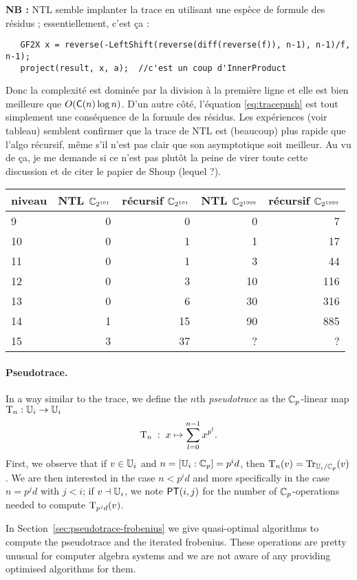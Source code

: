 \textbf{NB :} NTL semble implanter la trace en utilisant une espèce de
formule des résidus ; essentiellement, c'est ça :
{\footnotesize
\begin{verbatim}
   GF2X x = reverse(-LeftShift(reverse(diff(reverse(f)), n-1), n-1)/f, n-1);
   project(result, x, a);  //c'est un coup d'InnerProduct
\end{verbatim}}
Donc la complexité est dominée par la division à la première ligne et
elle est bien meilleure que $O(\mathrm{\sf C}(n)\log n)$. D'un autre côté,
l'équation \eqref{eq:tracepush} est tout simplement une conséquence de
la formule des résidus. Les expériences (voir tableau) semblent
confirmer que la trace de NTL est (beaucoup) plus rapide que l'algo
récursif, même s'il n'est pas clair que son asymptotique soit
meilleur. Au vu de ça, je me demande si ce n'est pas plutôt la peine
de virer toute cette discussion et de citer le papier de Shoup (lequel
?).

\begin{tabular}{|l|r|r|r|r|}
  \hline
  niveau & NTL $\mathbb{C}_{2^{101}}$ & récursif $\mathbb{C}_{2^{101}}$ & NTL $\mathbb{C}_{2^{1999}}$ &
  récursif $\mathbb{C}_{2^{1999}}$ \\
  \hline
  9  & 0 &  0 &  0 &   7\\
  10 & 0 &  1 &  1 &  17\\
  11 & 0 &  1 &  3 &  44\\
  12 & 0 &  3 & 10 & 116\\
  13 & 0 &  6 & 30 & 316\\
  14 & 1 & 15 & 90 & 885\\
  15 & 3 & 37 &  ? &   ?\\
  \hline
\end{tabular}


\paragraph{Pseudotrace.}
In a way similar to the trace, we define the $n$th {\em pseudotrace}
as the $\mathbb{C}_p$-linear map $\operatorname{T}_n : \mathbb{U}_i \rightarrow \mathbb{U}_i$ 
\[\operatorname{T}_n \;:\; x \mapsto \sum_{l=0}^{n-1} x^{p^l} \text{.}\]
First, we observe that if $v\in\mathbb{U}_i$ and $n=[\mathbb{U}_i:\mathbb{C}_p]=p^id$, then
${\operatorname{T}_n(v) = \operatorname{Tr}_{\mathbb{U}_i/\mathbb{C}_p}(v)}$. We are then interested in the case
$n<p^id$ and more specifically in the case $n = p^jd$ with $j<i$; if
$v\dashv\mathbb{U}_i$, we note $\mathrm{\sf PT}(i,j)$ for the number of
$\mathbb{C}_p$-operations needed to compute $\operatorname{T}_{p^jd}(v)$.

In Section~\ref{sec:pseudotrace-frobenius} we give quasi-optimal algorithms
to compute the pseudotrace and the iterated frobenius. These
operations are pretty unusual for computer algebra systems and we are
not aware of any providing optimised algorithms for them.

